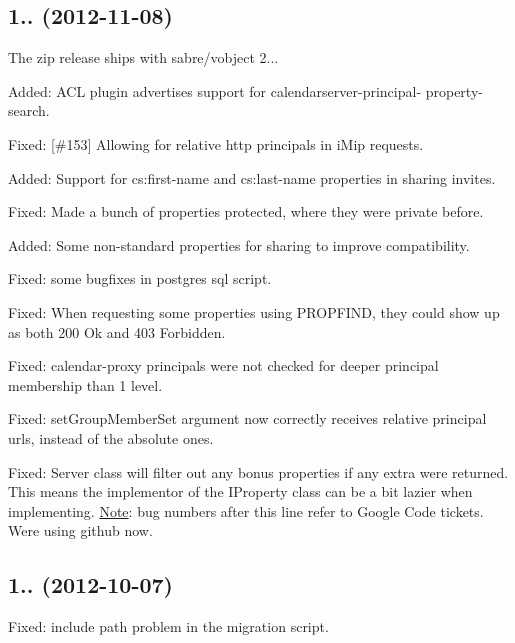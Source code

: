 \subsection*{1.. (2012-\/11-\/08) }


\begin{DoxyItemize}
\item The zip release ships with sabre/vobject 2...
\item Added\+: A\+CL plugin advertises support for \textquotesingle{}calendarserver-\/principal-\/ property-\/search\textquotesingle{}.
\item Fixed\+: \mbox{[}\#153\mbox{]} Allowing for relative http principals in i\+Mip requests.
\item Added\+: Support for cs\+:first-\/name and cs\+:last-\/name properties in sharing invites.
\item Fixed\+: Made a bunch of properties protected, where they were private before.
\item Added\+: Some non-\/standard properties for sharing to improve compatibility.
\item Fixed\+: some bugfixes in postgres sql script.
\item Fixed\+: When requesting some properties using P\+R\+O\+P\+F\+I\+ND, they could show up as both \textquotesingle{}200 Ok\textquotesingle{} and \textquotesingle{}403 Forbidden\textquotesingle{}.
\item Fixed\+: calendar-\/proxy principals were not checked for deeper principal membership than 1 level.
\item Fixed\+: set\+Group\+Member\+Set argument now correctly receives relative principal urls, instead of the absolute ones.
\item Fixed\+: Server class will filter out any bonus properties if any extra were returned. This means the implementor of the I\+Property class can be a bit lazier when implementing. \mbox{\hyperlink{class_note}{Note}}\+: bug numbers after this line refer to Google Code tickets. We\textquotesingle{}re using github now.
\end{DoxyItemize}

\subsection*{1.. (2012-\/10-\/07) }


\begin{DoxyItemize}
\item Fixed\+: include path problem in the migration script.
\end{DoxyItemize}

